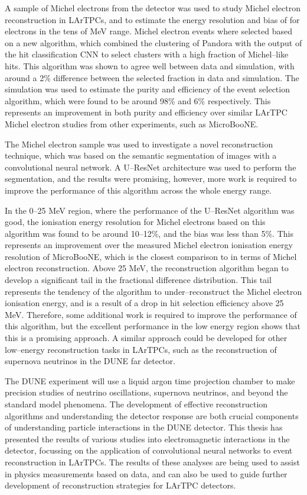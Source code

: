 A sample of Michel electrons from the \protodune{} detector was used to study
Michel electron reconstruction in LArTPCs, and to estimate the energy resolution
and bias of \protodune{} for electrons in the tens of MeV range. Michel electron
events where selected based on a new algorithm, which combined the clustering of
Pandora with the output of the hit classification CNN to select clusters with a
high fraction of Michel--like hits. This algorithm was shown to agree well
between data and simulation, with around a 2\% difference between the selected
fraction in data and simulation. The simulation was used to estimate the purity
and efficiency of the event selection algorithm, which were found to be around
98\% and 6\% respectively. This represents an improvement in both purity and
efficiency over similar LArTPC Michel electron studies from other experiments,
such as MicroBooNE.

The Michel electron sample was used to investigate a novel reconstruction
technique, which was based on the semantic segmentation of images with a
convolutional neural network. A U--ResNet architecture was used to perform the
segmentation, and the results were promising, however, more work is required to
improve the performance of this algorithm across the whole energy range. 

In the 0--25 MeV region, where the performance of the U--ResNet algorithm was 
good, the ionisation energy resolution for Michel electrons based on this 
algorithm was found to be around 10--12\%, and the bias was less than 
5\%. This represents an improvement over the measured Michel electron ionisation
energy resolution of MicroBooNE, which is the closest comparison to \protodune{}
in terms of Michel electron reconstruction. Above 25 MeV, the reconstruction 
algorithm began to develop a significant tail in the fractional difference 
distribution. This tail represents the tendency of the algorithm to 
under--reconstruct the Michel electron ionisation energy, and is a result of a 
drop in hit selection efficiency above 25 MeV. Therefore, some additional work
is required to improve the performance of this algorithm, but the excellent
performance in the low energy region shows that this is a promising approach. A
similar approach could be developed for other low--energy reconstruction tasks
in LArTPCs, such as the reconstruction of supernova neutrinos in the DUNE far
detector.

The DUNE experiment will use a liquid argon time projection chamber to make 
precision studies of neutrino oscillations, supernova neutrinos, and beyond 
the standard model phenomena. The development of effective reconstruction 
algorithms and understanding the detector response are both crucial components 
of understanding particle interactions in the DUNE detector. This thesis has 
presented the results of various studies into electromagnetic interactions in 
the \protodune{} detector, focussing on the application of convolutional 
neural networks to event reconstruction in LArTPCs. The results of these 
analyses are being used to assist in physics measurements based on 
\protodune{} data, and can also be used to guide further development of 
reconstruction strategies for LArTPC detectors.
